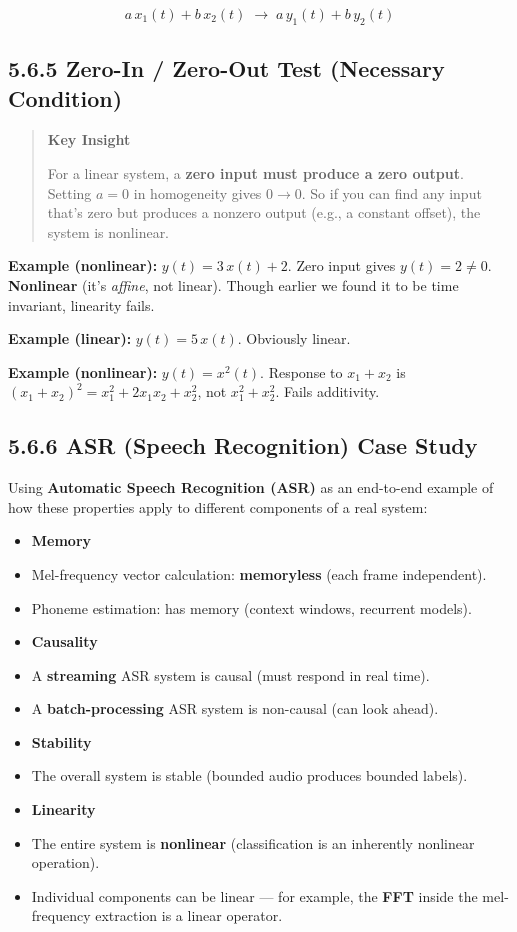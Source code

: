 \documentclass[11pt]{article}
\begin{document}
\[\boxed{\;a\,x_1(t) + b\,x_2(t) \;\longrightarrow\; a\,y_1(t) + b\,y_2(t)\;}\]

\subsection*{5.6.5 Zero-In / Zero-Out Test (Necessary Condition)}

\begin{quote}
\textbf{Key Insight}

For a linear system, a \textbf{zero input must produce a zero output}. Setting $a = 0$ in homogeneity gives $0 \to 0$. So if you can find any input that's zero but produces a nonzero output (e.g., a constant offset), the system is nonlinear.
\end{quote}

\textbf{Example (nonlinear):} $y(t) = 3\,x(t) + 2$. Zero input gives $y(t) = 2 \neq 0$. \textbf{Nonlinear} (it's \textit{affine}, not linear). Though earlier we found it to be time invariant, linearity fails.

\textbf{Example (linear):} $y(t) = 5\,x(t)$. Obviously linear.

\textbf{Example (nonlinear):} $y(t) = x^2(t)$. Response to $x_1+x_2$ is $(x_1+x_2)^2 = x_1^2 + 2 x_1 x_2 + x_2^2$, not $x_1^2 + x_2^2$. Fails additivity.

\subsection*{5.6.6 ASR (Speech Recognition) Case Study}

Using \textbf{Automatic Speech Recognition (ASR)} as an end-to-end example of how these properties apply to different components of a real system:

\begin{itemize}
  \item \textbf{Memory}
  \item Mel-frequency vector calculation: \textbf{memoryless} (each frame independent).
  \item Phoneme estimation: has memory (context windows, recurrent models).
  \item \textbf{Causality}
  \item A \textbf{streaming} ASR system is causal (must respond in real time).
  \item A \textbf{batch-processing} ASR system is non-causal (can look ahead).
  \item \textbf{Stability}
  \item The overall system is stable (bounded audio produces bounded labels).
  \item \textbf{Linearity}
  \item The entire system is \textbf{nonlinear} (classification is an inherently nonlinear operation).
  \item Individual components can be linear — for example, the \textbf{FFT} inside the mel-frequency extraction is a linear operator.
\end{itemize}
\end{document}
